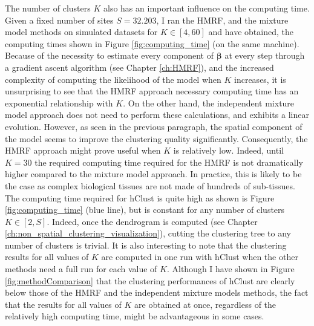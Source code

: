 	The number of clusters $K$ also has an important influence on the computing time. Given a fixed number of sites $S=32.203$, I ran the HMRF, and the mixture model methods on simulated datasets for $K \in [4,60]$ and have obtained, the computing times shown in Figure \ref{fig:computing_time} (on the same machine).\\
	
	Because of the necessity to estimate every component of $\boldsymbol{\beta}$ at every step through a gradient ascent algorithm (see Chapter \ref{ch:HMRF}), and the increased complexity of computing the likelihood of the model when $K$ increases, it is unsurprising to see that the HMRF approach necessary computing time has an exponential relationship with $K$. On the other hand, the independent mixture model approach does not need to perform these calculations, and exhibits a linear evolution. However, as seen in the previous paragraph, the spatial component of the model seems to improve the clustering quality significantly. Consequently, the HMRF approach might prove useful when $K$ is relatively low. Indeed, until $K=30$ the required computing time required for the HMRF is not dramatically higher compared to the mixture model approach. In practice, this is likely to be the case as complex biological tissues are not made of hundreds of sub-tissues. \\
	
	The computing time required for hClust is quite high as shown is Figure \ref{fig:computing_time} (blue line), but is constant for any number of clusters $K \in [2,S]$. Indeed, once the dendrogram is computed (see Chapter \ref{ch:non_spatial_clustering_visualization}), cutting the clustering tree to any number of clusters is trivial. It is also interesting to note that the clustering results for all values of $K$ are computed in one run with hClust when the other methods need a full run for each value of $K$. Although I have shown in Figure \ref{fig:methodComparison} that the clustering performances of hClust are clearly below those of the HMRF and the independent mixture models methods, the fact that the results for all values of $K$ are obtained at once, regardless of the relatively high computing time, might be advantageous in some cases. 
	
